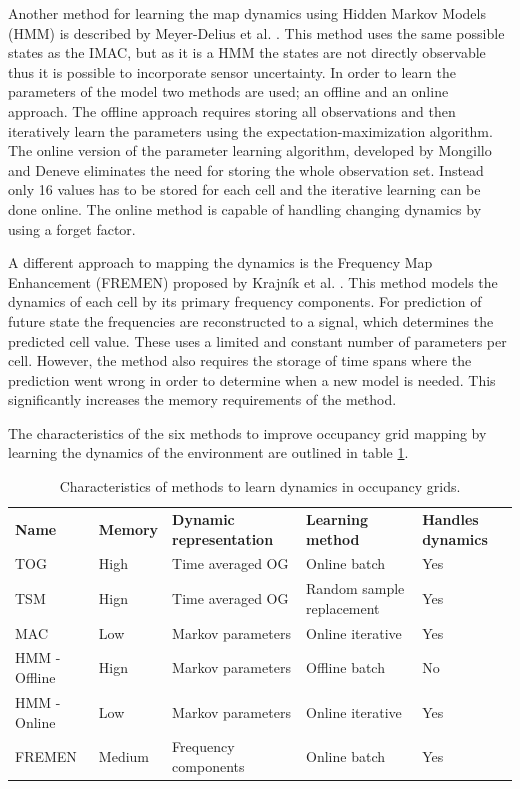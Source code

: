 Another method for learning the map dynamics using Hidden Markov Models (HMM) is described by Meyer-Delius et al. \cite{Meyer-Delius2012}. This method uses the same possible states as the IMAC, but as it is a HMM the states are not directly observable thus it is possible to incorporate sensor uncertainty. In order to learn the parameters of the model two methods are used; an offline and an online approach. The offline approach requires storing all observations and then iteratively learn the parameters using the expectation-maximization algorithm. The online version of the parameter learning algorithm, developed by Mongillo and Deneve \cite{Mongillo2008} eliminates the need for storing the whole observation set. Instead only 16 values has to be stored for each cell and the iterative learning can be done online. The online method is capable of handling changing dynamics by using a forget factor. 

A different approach to mapping the dynamics is the Frequency Map Enhancement (FREMEN) proposed by Krajník et al. \cite{Krajnik2014}. This method models the dynamics of each cell by its primary frequency components. For prediction of future state the frequencies are reconstructed to a signal, which determines the predicted cell value. These uses a limited and constant number of parameters per cell. However, the method also requires the storage of time spans where the prediction went wrong in order to determine when a new model is needed. This significantly increases the memory requirements of the method.

The characteristics of the six methods to improve occupancy grid mapping by learning the dynamics of the environment are outlined in table \ref{tab:learners_characteristics}.

\begin{table}[htbp]
	\centering
	\caption{Characteristics of methods to learn dynamics in occupancy grids.}
	\label{tab:learners_characteristics}
	\begin{tabular}{p{2.6cm} | p{1.6cm} | p{} | p{2.6cm} | p{1.6cm}}
		\toprule
		\textbf{Name} & \textbf{Memory} & \textbf{Dynamic representation} & \textbf{Learning method} & \textbf{Handles dynamics} \\
		\rowcolor[gray]{0.925}
		TOG & High & Time averaged OG & Online batch & Yes \\
		TSM & Hign & Time  averaged OG & Random sample replacement  & Yes\\
		\rowcolor[gray]{0.925}
		MAC & Low & Markov parameters & Online iterative & Yes \\
		HMM - Offline & Hign & Markov parameters & Offline batch  & No \\
		\rowcolor[gray]{0.925} 
		HMM - Online & Low & Markov parameters & Online iterative & Yes \\
		FREMEN & Medium & Frequency components & Online batch & Yes\\
		\bottomrule
	\end{tabular}
\end{table}